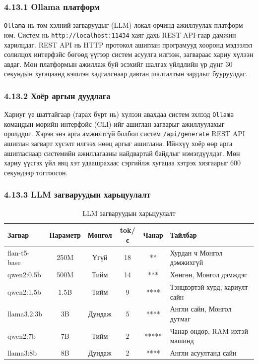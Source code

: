 \documentclass[11pt,a4paper]{article}
\begin{document}
\subsubsection*{4.13.1 Ollama платформ}

\texttt{Ollama} нь том хэлний загваруудыг (LLM) локал орчинд ажиллуулах платформ юм. Систем нь \texttt{http://localhost:11434} хаяг дахь REST API-гаар дамжин харилцдаг. REST API нь HTTP протокол ашиглан програмууд хооронд мэдээлэл солилцох интерфэйс бөгөөд үүгээр систем асуулга илгээж, загвараас хариу хүлээн авдаг. Мөн платформын ажиллаж буй эсэхийг шалгах үйлдлийн үр дүнг 30 секундын хугацаанд кэшлэн хадгалснаар давтан шалгалтын зардлыг бууруулдаг.
\subsubsection*{4.13.2 Хоёр аргын дуудлага}

Хариуг үе шаттайгаар (гарах бүрт нь) хүлээн авахдаа систем эхлээд \texttt{Ollama} командын мөрийн интерфэйс (CLI)-ийг ашиглан загварыг ажиллуулахыг оролддог. Хэрэв энэ арга амжилтгүй болбол систем \texttt{/api/generate} REST API ашиглан загварт хүсэлт илгээх нөөц аргыг ашиглана. Ийнхүү хоёр өөр арга ашигласнаар системийн ажиллагааны найдвартай байдлыг нэмэгдүүлдэг. Мөн хариу үүсгэх үйл явц хэт удаашрахаас сэргийлж хугацаа хэтрэх хязгаарыг 600 секундээр тогтоосон.

\subsubsection*{4.13.3 LLM загваруудын харьцуулалт}

\begin{table}[H]
\centering
\caption{LLM загваруудын харьцуулалт}
\label{tab:llm_comparison}
\small
\begin{tabularx}{\textwidth}{|l|c|c|c|c|X|}
\hline
\textbf{Загвар} & \textbf{Параметр} & \textbf{Монгол} & \textbf{tok/с} & \textbf{Чанар} & \textbf{Тайлбар} \\
\hline
flan-t5-base  & 250M & Үгүй   & 18 & **      & Хурдан ч Монгол дэмжихгүй \\
\hline
qwen2:0.5b    & 500M & Тийм   & 14 & ***    & Хөнгөн, Монгол дэмждэг \\
\hline
qwen2:1.5b    & 1.5B & Тийм   & 9  & ****  & Тэнцвэртэй хурд, хариулт сайн \\
\hline
llama3.2:3b   & 3B   & Дундаж & 5  & ****  & Англи сайн, Монгол дутмаг \\
\hline
qwen2:7b      & 7B   & Тийм   & 2  & ***** & Чанар өндөр, RAM ихтэй машинд \\
\hline
llama3:8b     & 8B   & Дундаж & 2  & ****  & Англи асуултанд сайн \\
\hline
\end{tabularx}
\end{table}
\end{document}
